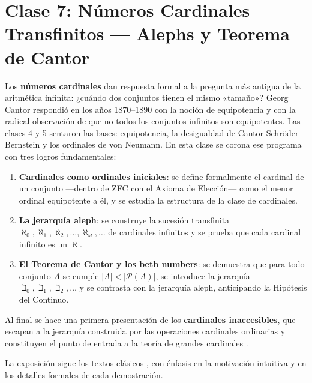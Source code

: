 \chapter{Clase 7: Números Cardinales Transfinitos — Alephs y Teorema de Cantor}

Los \textbf{números cardinales} dan respuesta formal a la pregunta más antigua de la aritmética infinita: ¿cuándo dos conjuntos tienen el mismo «tamaño»? Georg Cantor respondió en los años 1870–1890 con la noción de equipotencia y con la radical observación de que no todos los conjuntos infinitos son equipotentes. Las clases 4 y 5 sentaron las bases: equipotencia, la desigualdad de Cantor-Schröder-Bernstein y los ordinales de von Neumann. En esta clase se corona ese programa con tres logros fundamentales:

\begin{enumerate}[leftmargin=2em, label=(\roman*)]
  \item \textbf{Cardinales como ordinales iniciales}: se define formalmente el cardinal de un conjunto —dentro de ZFC con el Axioma de Elección— como el menor ordinal equipotente a él, y se estudia la estructura de la clase de cardinales.
  \item \textbf{La jerarquía aleph}: se construye la sucesión transfinita $\aleph_0, \aleph_1, \aleph_2, \ldots, \aleph_\omega, \ldots$ de cardinales infinitos y se prueba que cada cardinal infinito es un $\aleph$.
  \item \textbf{El Teorema de Cantor y los beth numbers}: se demuestra que para todo conjunto $A$ se cumple $|A| < |\mathcal{P}(A)|$, se introduce la jerarquía $\beth_0, \beth_1, \beth_2, \ldots$ y se contrasta con la jerarquía aleph, anticipando la Hipótesis del Continuo.
\end{enumerate}

Al final se hace una primera presentación de los \textbf{cardinales inaccesibles}, que escapan a la jerarquía construida por las operaciones cardinales ordinarias y constituyen el punto de entrada a la teoría de grandes cardinales \cite{kanamori2003, jech2003}.

La exposición sigue los textos clásicos \cite{jech2003, kunen2011, enderton1977, hrbacek1999, levy1979, sierpinski1958}, con énfasis en la motivación intuitiva y en los detalles formales de cada demostración.

